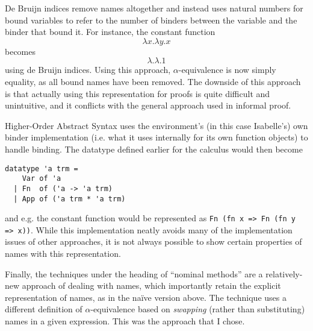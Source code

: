 De Bruijn indices remove names altogether and instead uses natural numbers for bound variables to refer to the number of binders between the variable and the binder that bound it.
For instance, the constant function
\[
\lambda x. \lambda y. x
\]
becomes
\[
\lambda.\lambda. 1
\]
using de Bruijn indices.
Using this approach, \(\alpha\)-equivalence is now simply equality, as all bound names have been removed.
The downside of this approach is that actually using this representation for proofs is quite difficult and unintuitive, and it conflicts with the general approach used in informal proof.

Higher-Order Abstract Syntax uses the environment's (in this case Isabelle's) own binder implementation (i.e. what it uses internally for its own function objects) to handle binding.
The datatype defined earlier for the calculus would then become
\begin{verbatim}
datatype 'a trm =
    Var of 'a
  | Fn  of ('a -> 'a trm)
  | App of ('a trm * 'a trm)
\end{verbatim}
and e.g. the constant function would be represented as \texttt{Fn (fn x => Fn (fn y => x))}.
While this implementation neatly avoids many of the implementation issues of other approaches, it is not always possible to show certain properties of names with this representation\cite{HOAS}.

Finally, the techniques under the heading of ``nominal methods'' are a relatively-new approach of dealing with names, which importantly retain the explicit representation of names, as in the na\"ive version above.
The technique uses a different definition of \(\alpha\)-equivalence based on \emph{swapping} (rather than substituting) names in a given expression\cite{nominal}.
This was the approach that I chose.

